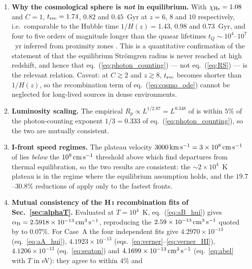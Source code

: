 \documentclass[11pt,a4paper]{article}
\newcommand{\aB}{\alpha_{\rm B}}
\newcommand{\ion}[2]{\textrm{#1\,\textsc{#2}}}
\newcommand{\cms}{\,{\rm cm^{3}\,s^{-1}}}
\begin{document}
\begin{enumerate}
      $R_{\rm S}=3.2$~pc and $t_{\rm rec}=1.2$~kyr, so a compact \ion{H}{ii} region reaches
      equilibrium essentially instantaneously --- consistent with the classical, static
      interpretation.
\item \textbf{Why the cosmological sphere is \emph{not} in equilibrium.} With
      $\chi_{\rm He}=1.08$ and $C=1$, $t_{\rm rec}=1.74$, $0.82$ and $0.45$~Gyr at $z=6$, $8$ and
      $10$ respectively, i.e.\ comparable to the Hubble time $1/H(z)=1.43$, $0.98$ and $0.73$~Gyr,
      and four to five orders of magnitude longer than the quasar lifetimes
      $t_Q\sim10^4$--$10^7$~yr inferred from proximity zones
      \citep{Eilers2017,Eilers2020,Onorato2025}. This is a quantitative confirmation of the
      statement of \citet{Cen2000} that the equilibrium Str\"omgren radius is never reached at high
      redshift, and hence that eq.~(\ref{eq:photon_counting}) --- not eq.~(\ref{eq:RS}) --- is the
      relevant relation. Caveat: at $C\gtrsim2$ and $z\gtrsim8$, $t_{\rm rec}$ becomes shorter than
      $1/H(z)$, so the recombination term of eq.~(\ref{eq:cosmo_ode}) cannot be neglected for
      long-lived sources in dense environments.
\item \textbf{Luminosity scaling.} The empirical $R_p\propto L^{1/2.87}=L^{0.348}$ of
      \citet{Onorato2025} is within $5\%$ of the photon-counting exponent $1/3=0.333$ of
      eq.~(\ref{eq:photon_counting}), so the two are mutually consistent.
\item \textbf{I-front speed regimes.} The plateau velocity $3000\,{\rm km\,s^{-1}}
      =3\times10^8\,{\rm cm\,s^{-1}}$ of \citet{Zhu2025} lies \emph{below} the
      $10^9\,{\rm cm\,s^{-1}}$ threshold above which \citet{Zeng2020} find departures from thermal
      equilibration, so the two results are consistent: the $\sim2\times10^4$~K plateau is in the
      regime where the equilibrium assumption holds, and the $19.7$--$30.8\%$ reductions of
      \citet{Zeng2020} apply only to the fastest fronts.
\item \textbf{Mutual consistency of the H\,\textsc{i} recombination fits of
      Sec.~\ref{sec:alphaT}.} Evaluated at $T=10^4$~K, eq.~(\ref{eq:aB_hui}) gives
      $\aB=2.5918\times10^{-13}\cms$, reproducing the $2.59\times10^{-13}\cms$ quoted by
      \citet{Shapiro2006} to $0.07\%$. For Case~A the four independent fits give
      $4.2970\times10^{-13}$ (eq.~\ref{eq:aA_hui}), $4.1923\times10^{-13}$
      (eqs.~\ref{eq:verner}--\ref{eq:verner_HI}), $4.1206\times10^{-13}$ (eq.~\ref{eq:seaton}) and
      $4.1699\times10^{-13}\cms$ (eq.~\ref{eq:abel} with $T$ in eV): they agree to within $4\%$ and

\end{enumerate}
\end{document}
